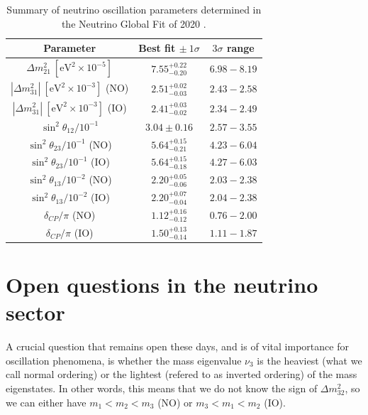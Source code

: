 \begin{table}
\centering
\caption{Summary of neutrino oscillation parameters determined in the Neutrino Global Fit of 2020 \cite{deSalas2020}.}
	\begin{tabular}{c|c|c}
		Parameter                                               & Best fit $\pm ~ 1\sigma$ & $3 \sigma$ range   \\[1mm] \hline \rule{0pt}{1.1\normalbaselineskip}
		$\Delta m^{2}_{21}~[\mathrm{eV}^{2} \times 10^{-5}]$                   & $7.55^{+0.22}_{-0.20}$ & $6.98-8.19$\\[3mm]
		$\left|\Delta m^{2}_{31}\right|~[\mathrm{eV}^{2}\times 10^{-3}]$ (NO) & $2.51^{+0.02}_{-0.03}$    & $2.43-2.58$\\[2mm]
		$\left|\Delta m^{2}_{31}\right|~[\mathrm{eV}^{2}\times 10^{-3}]$ (IO) & $2.41^{+0.03}_{-0.02}$ & $2.34-2.49$    \\[3mm]
		$\sin^{2} \theta_{12} / 10^{-1}$ & $3.04 \pm 0.16$ & $2.57-3.55$ \\[3mm]
		$\sin^{2} \theta_{23} / 10^{-1}$ (NO) & $5.64^{+0.15}_{-0.21}$ & $4.23-6.04$ \\[2mm]
		$\sin^{2} \theta_{23} / 10^{-1}$ (IO) & $5.64^{+0.15}_{-0.18}$ & $4.27-6.03$ \\[3mm]
		$\sin^{2} \theta_{13} / 10^{-2}$ (NO) & $2.20^{+0.05}_{-0.06}$ & $2.03-2.38$ \\[2mm]
		$\sin^{2} \theta_{13} / 10^{-2}$ (IO) & $2.20^{+0.07}_{-0.04}$ & $2.04-2.38$ \\[3mm]
		$\delta_{CP} / \pi$ (NO) & $1.12^{+0.16}_{-0.12}$ & $0.76-2.00$ \\[2mm]
		$\delta_{CP} / \pi$ (IO) & $1.50^{+0.13}_{-0.14}$ & $1.11-1.87$
	\end{tabular}
	\label{tab:neutrino_global_fit}
\end{table}

\section{Open questions in the neutrino sector}

A crucial question that remains open these days, and is of vital importance for oscillation phenomena, is whether the mass eigenvalue $\nu_{3}$ is the heaviest (what we call normal ordering) or the lightest (refered to as inverted ordering) of the mass eigenstates. In other words, this means that we do not know the sign of $\Delta m^{2}_{32}$, so we can either have $m_{1}<m_{2}<m_{3}$ (NO) or $m_{3}<m_{1}<m_{2}$ (IO).

